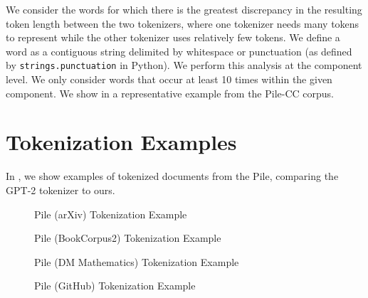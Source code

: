 \documentclass[11pt]{article}
\begin{document}
We consider the words for which there is the greatest discrepancy in the resulting token length between the two tokenizers, where one tokenizer needs many tokens to represent while the other tokenizer uses relatively few tokens. We define a word as a contiguous string delimited by whitespace or punctuation (as defined by \texttt{strings.punctuation} in Python). We perform this analysis at the component level. We only consider words that occur at least 10 times within the given component. We show in  a representative example from the Pile-CC corpus.

\section{Tokenization Examples}\label{app:tokenization}

In , we show examples of tokenized documents from the Pile, comparing the GPT-2 tokenizer to ours.

\begin{figure}[p]
    \centering
    
    \caption{Pile (arXiv) Tokenization Example}
    \label{fig:tok_example_0}
\end{figure}

\begin{figure}[p]
    \centering
    
    \caption{Pile (BookCorpus2) Tokenization Example}
    \label{fig:tok_example_1}
\end{figure}

\begin{figure}[p]
    \centering
    
    \caption{Pile (DM Mathematics) Tokenization Example}
    \label{fig:tok_example_3}
\end{figure}

\begin{figure}[p]
    \centering
    
    \caption{Pile (GitHub) Tokenization Example}
    \label{fig:tok_example_7}
\end{figure}
\end{document}
